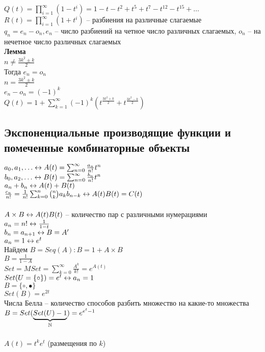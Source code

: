 \documentclass[12pt]{article}
\begin{document}
$Q(t) = \prod_{i=1}^\infty (1-t^i) = 1 - t - t^2 + t^5 + t^7 - t^{12} - t^{15} + \ldots$\\
$R(t) = \prod_{i=1}^\infty (1+t^i)$ -- разбиения на различные слагаемые\\
$q_n = e_n - o_n, e_n$ -- число разбиений на четное число различных слагаемых, $o_n$ -- на нечетное число различных слагаемых\\
\textbf{Лемма}\\
$n \neq \frac{3k^2 \pm  k}{2}$\\
Тогда $e_n = o_n$\\
$n = \frac{3k^2 \pm k}{2}$\\
$e_n - o_n = (-1)^k$\\
$Q(t) = 1 + \sum_{k=1}^\infty (-1)^k (t^{\frac{3k^2+k}2}+t^{\frac{3k^2-k}2})$
\subsection{Экспоненциальные производящие функции и помеченные комбинаторные объекты}
$a_0, a_1, \ldots \leftrightarrow A(t) = \sum_{n=0}^{\infty} \frac{a_n}{n!}t^n$\\
$b_0, a_2, \ldots \leftrightarrow B(t) = \sum_{n=0}^\infty \frac{b_n}{n!}t^n$\\
$a_n + b_n \leftrightarrow A(t) + B(t)$\\
$\frac{c_n}{n!} = \frac{1}{n!}\sum_{k=0}^{n} \binom{n}{k}a_k b_{n-k} \leftrightarrow A(t)B(t) = C(t)$\\\\
$A \times B \leftrightarrow A(t)B(t)$ -- количество пар с различными нумерациями\\
$a_n = n! \leftrightarrow \frac{1}{1-t}$\\
$b_n = a_{n+1} \leftrightarrow B = A'$\\
$a_n = 1 \leftrightarrow e^t$\\
Найдем $B = Seq(A): B = 1 + A\times B$\\
$B = \frac{1}{1-A}$\\
$Set = MSet = \sum_{k=0}^\infty \frac{A^k}{k!} = e^{A(t)}$\\
$Set(U = \{\circ\}) = e^t \leftrightarrow a_n = 1$\\
$B = \{\circ, \bullet\}$\\
$Set(B) = e^{2t}$\\
Числа Белла -- количество способов разбить множество на какие-то множества\\
$B = Set(\underbrace{Set(U) - 1}_{\mathbb{N}}) = e^{e^t - 1}$\\\\
$A(t) = t^k e^t$ (размещения по $k$)\\
\end{document}
